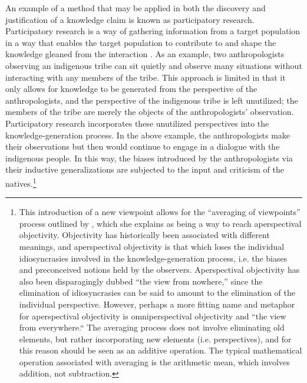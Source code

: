 \documentclass[a4paper]{article}
\begin{document}
An example of a method that may be applied in both the discovery and
justification of a knowledge claim is known as participatory research.
Participatory research is a way of gathering information from a target
population in a way that enables the target population to contribute to and
shape the knowledge gleaned from the interaction
\citep{bergold2012participatory}. As an example, two anthropologists observing
an indigenous tribe can sit quietly and observe many situations without
interacting with any members of the tribe. This approach is limited in that it
only allows for knowledge to be generated from the perspective of the
anthropologists, and the perspective of the indigenous tribe is left
unutilized; the members of the tribe are merely the objects of the
anthropologists' observation. Participatory research incorporates these
unutilized perspectives into the knowledge-generation process. In the above
example, the anthropologists make their observations but then would continue
to engage in a dialogue with the indigenous people. In this way, the biases
introduced by the anthropologists via their inductive generalizations are
subjected to the input and criticism of the natives.\footnote{This
    introduction of a new viewpoint allows for the ``averaging of viewpoints''
    process outlined by \cite{datson1992objectivity}, which she explains as
    being a way to reach aperspectival objectivity. Objectivity has
    historically been associated with different meanings, and aperspectival
    objectivity is that which loses the individual idiosyncrasies involved in
    the knowledge-generation process, i.e. the biases and preconceived notions
    held by the observers. Aperspectival objectivity has also been
    disparagingly dubbed ``the view from nowhere,'' since the elimination of
    idiosyncrasies can be said to amount to the elimination of the individual
    perspective. However, perhaps a more fitting name and metaphor for
    aperspectival objectivity is omniperspectival objectivity and ``the view
    from everywhere.`` The averaging process does not involve eliminating old
    elements, but rather incorporating new elements (i.e. perspectives), and
    for this reason should be seen as an additive operation. The typical
mathematical operation associated with averaging is the arithmetic mean, which
involves addition, not subtraction.}
\end{document}
